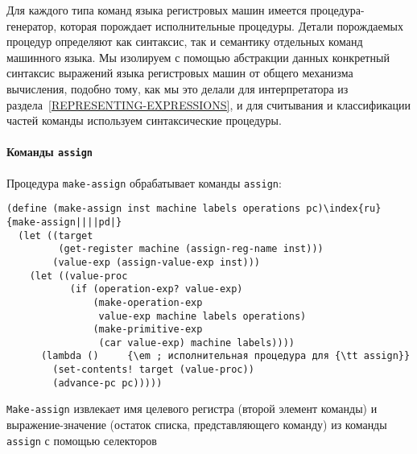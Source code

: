 Для каждого типа команд языка регистровых машин имеется
процедура-генератор, которая порождает исполнительные процедуры.  Детали
порождаемых процедур определяют как синтаксис, так и семантику
отдельных команд машинного языка.  Мы изолируем с
помощью абстракции данных конкретный синтаксис
выражений языка регистровых машин от общего механизма вычисления,
подобно тому, как мы это делали для
интерпретатора из раздела~\ref{REPRESENTING-EXPRESSIONS},
и для считывания и классификации частей команды используем
синтаксические процедуры.

\paragraph{Команды {\tt assign}}


Процедура {\tt make-assign} обрабатывает команды
{\tt assign}:

\begin{Verbatim}[fontsize=\small]
(define (make-assign inst machine labels operations pc)\index{ru}{make-assign||||pd|}
  (let ((target
         (get-register machine (assign-reg-name inst)))
        (value-exp (assign-value-exp inst)))
    (let ((value-proc
           (if (operation-exp? value-exp)
               (make-operation-exp
                value-exp machine labels operations)
               (make-primitive-exp
                (car value-exp) machine labels))))
      (lambda ()     {\em ; исполнительная процедура для {\tt assign}}
        (set-contents! target (value-proc))
        (advance-pc pc)))))
\end{Verbatim}
{\tt Make-assign} извлекает имя целевого регистра (второй
элемент команды) и выражение-значение (остаток списка, представляющего
команду) из команды {\tt assign} с помощью селекторов

